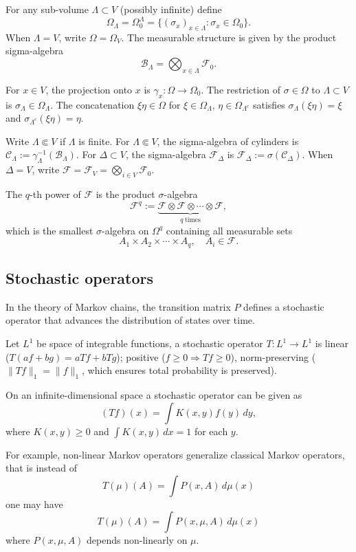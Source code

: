 \documentclass[11pt,reqno]{amsart}
\numberwithin{equation}{section} \setcounter{tocdepth}{1}
\begin{document}
	 For any sub-volume $\Lambda \subset V$ (possibly infinite) define
	$$
	\Omega_\Lambda = \Omega_0^\Lambda = \{ (\sigma_x)_{x \in \Lambda} : \sigma_x \in \Omega_0 \}.
	$$
	When $\Lambda = V$, write $\Omega = \Omega_V$. The measurable structure is given by the product sigma-algebra
	$$
	\mathcal{B}_\Lambda = \bigotimes_{x \in \Lambda} \mathcal{F}_0.
	$$
	
	For $x \in V$, the projection onto $x$ is $\gamma_x : \Omega \to \Omega_0$. The restriction of $\sigma \in \Omega$ to $\Lambda \subset V$ is $\sigma_\Lambda \in \Omega_\Lambda$. The concatenation $\xi\eta \in \Omega$ for $\xi \in \Omega_\Lambda$, $\eta \in \Omega_{\Lambda^c}$ satisfies $\sigma_\Lambda(\xi\eta) = \xi$ and $\sigma_{\Lambda^c}(\xi\eta) = \eta$.
	
	 Write $\Lambda \Subset V$ if $\Lambda$ is finite. For  $\Lambda \Subset V$, the sigma-algebra of cylinders is
	$\mathcal{C}_{\Lambda} := \gamma_\Lambda^{-1}(\mathcal{B}_\Lambda)$. For $\Delta \subset V$, the sigma-algebra $\mathcal{F}_\Delta$ is $\mathcal{F}_\Delta := \sigma(\mathcal{C}_\Delta).$ When $\Delta = V$, write $\mathcal{F} = \mathcal{F}_V = \bigotimes_{i \in V} \mathcal{F}_0$.
	
	The $q$-th power of $\mathcal F$ is the product $\sigma$-algebra
	$$
	\mathcal F^q := \underbrace{\mathcal F \otimes \mathcal F \otimes \cdots \otimes \mathcal F}_{q \ \text{times}},
	$$
	which is the smallest $\sigma$-algebra on $\Omega^q$ containing all measurable sets
	$$
	A_1 \times A_2 \times \cdots \times A_q, \quad A_i \in \mathcal F.
	$$
\subsection{Stochastic operators} 

 In the theory of Markov chains, the transition matrix $P$ defines 
 a stochastic operator that advances the distribution of states over time.

Let $L^1$ be  space of integrable functions, 
a stochastic operator $T: L^1 \to L^1$ is linear ($T(af + bg) = aTf + bTg$);
positive ($f \geq 0 \Rightarrow Tf \geq 0$), norm-preserving ($\|Tf\|_1 = \|f\|_1$, which ensures total probability is preserved).

On an infinite-dimensional space a stochastic operator can be given as
$$
(Tf)(x) = \int K(x, y) f(y) \, dy,
$$
where $K(x, y) \geq 0$ and $\int K(x, y) \, dx = 1$ for each $y$.

For example, non-linear Markov operators generalize classical 
Markov operators, that is instead of
$$
T(\mu)(A) = \int P(x, A) \, d\mu(x)
$$
one may have
$$
T(\mu)(A) = \int P(x, \mu, A) \, d\mu(x)
$$
where $P(x, \mu, A)$ depends non-linearly on $\mu$.
\end{document}
